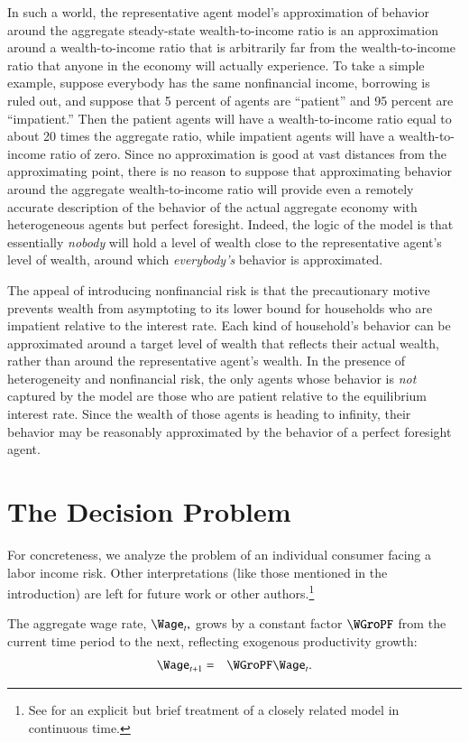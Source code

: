 \documentclass[titlepage,abstract]{\econtex}\newcommand{\texname}{ctDiscrete}
\begin{document}
  In such a world, the representative agent model's approximation of
  behavior around the aggregate steady-state wealth-to-income ratio is
  an approximation around a wealth-to-income ratio that is arbitrarily
  far from the wealth-to-income ratio that anyone in the economy will
  actually experience.  To take a simple example, suppose everybody
  has the same nonfinancial income, borrowing is ruled out, and
  suppose that 5 percent of agents are ``patient'' and 95 percent are
  ``impatient.''  Then the patient agents will have a wealth-to-income
  ratio equal to about 20 times the aggregate ratio, while impatient
  agents will have a wealth-to-income ratio of zero.  Since no
  approximation is good at vast distances from the approximating
  point, there is no reason to suppose that approximating behavior
  around the aggregate wealth-to-income ratio will provide even a
  remotely accurate description of the behavior of the actual
  aggregate economy with heterogeneous agents but perfect foresight.
  Indeed, the logic of the model is that essentially {\it nobody} will
  hold a level of wealth close to the representative agent's level of
  wealth, around which {\it everybody's} behavior is approximated.

  The appeal of introducing nonfinancial risk is that the
  precautionary motive prevents wealth from asymptoting to its lower
  bound for households who are impatient relative to the interest
  rate.  Each kind of household's behavior can be approximated around
  a target level of wealth that reflects their actual wealth, rather
  than around the representative agent's wealth.  In the presence of 
heterogeneity and nonfinancial risk, the only agents whose behavior is
{\it not} captured by the model are those who are patient relative to the equilibrium interest rate.  Since the wealth of those agents is heading to infinity, 
their behavior may be reasonably approximated by the behavior of a perfect foresight
agent.


\section{The Decision Problem}
For concreteness, we analyze the problem of an individual consumer
facing a labor income risk.  Other interpretations (like those
mentioned in the introduction) are left for future work or other
authors.\footnote{See \cite{toche:urisk} for an explicit but brief treatment 
  of a closely related model in continuous time.}

The aggregate wage rate, $\Wage_{t},$ grows by a constant factor $\WGroPF$ from the current time period to the next, reflecting exogenous productivity growth:
\begin{eqnarray}
        \Wage_{t+1} & = & \WGroPF \Wage_{t}.
\end{eqnarray}
\end{document}
